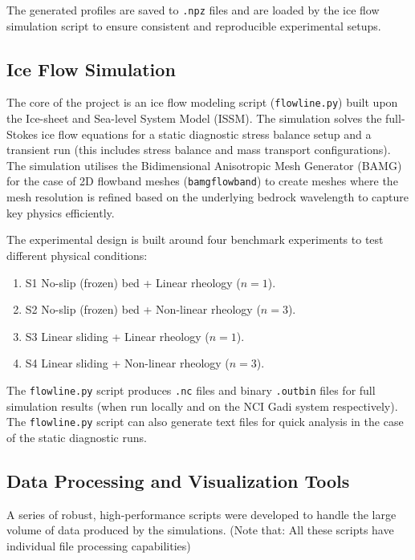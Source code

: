 The generated profiles are saved to \texttt{.npz} files and are loaded by the ice flow simulation script to ensure consistent and reproducible experimental setups.

\subsection{Ice Flow Simulation}

The core of the project is an ice flow modeling script (\texttt{flowline.py}) built upon the Ice-sheet and Sea-level System Model (ISSM). The simulation solves the full-Stokes ice flow equations for a static diagnostic stress balance setup and a transient run (this includes stress balance and mass transport configurations). The simulation utilises the Bidimensional Anisotropic Mesh Generator (BAMG) for the case of 2D flowband meshes (\texttt{bamgflowband}) to create meshes where the mesh resolution is refined based on the underlying bedrock wavelength to capture key physics efficiently.

The experimental design is built around four benchmark experiments to test different physical conditions:

\begin{enumerate}
\item{S1} No-slip (frozen) bed + Linear rheology ($n=1$).
\item{S2} No-slip (frozen) bed + Non-linear rheology ($n=3$).
\item{S3} Linear sliding + Linear rheology ($n=1$).
\item{S4} Linear sliding + Non-linear rheology ($n=3$).
\end{enumerate}

The \texttt{flowline.py} script produces \texttt{.nc} files and binary \texttt{.outbin} files for full simulation results (when run locally and on the NCI Gadi system respectively). The \texttt{flowline.py} script can also generate text files for quick analysis in the case of the static diagnostic runs.

\subsection{Data Processing and Visualization Tools}

A series of robust, high-performance scripts were developed to handle the large volume of data produced by the simulations. (Note that: All these scripts have individual file processing capabilities)

